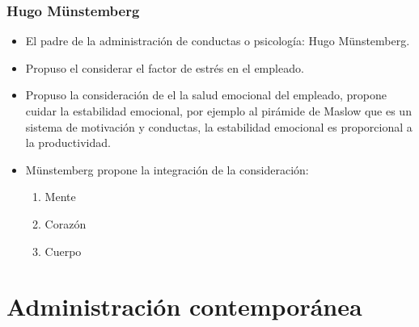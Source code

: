 \subsubsection{Hugo Münstemberg}    
\begin{itemize}
    \item El padre de la administración de conductas o psicología: Hugo Münstemberg.
    \item Propuso el considerar el factor de estrés en el empleado.
    \item Propuso la consideración de el la salud emocional del empleado, propone cuidar la estabilidad emocional, por ejemplo al pirámide de Maslow que es un sistema de motivación y conductas, la estabilidad emocional es proporcional a la productividad.
    \item Münstemberg propone la integración de la consideración:
        \begin{enumerate}
            \item Mente
            \item Corazón 
            \item Cuerpo
        \end{enumerate}
\end{itemize}



\section{Administración contemporánea}
